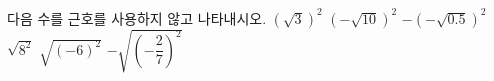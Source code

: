 다음 수를 근호를 사용하지 않고 나타내시오.
 $(\sqrt{3})^2$
 $(-\sqrt{10})^2$
 $-(-\sqrt{0.5})^2$
 $\sqrt{8^2}$
 $\sqrt{(-6)^2}$
 $-\sqrt{\left(-\dfrac{2}{7}\right)^2}$
